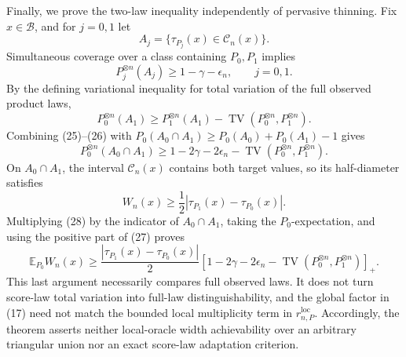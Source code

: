 Finally, we prove the two-law inequality independently of pervasive thinning.  Fix \(x\in\mathcal B\), and for \(j=0,1\) let
\[
 A_j=\{\tau_{P_j}(x)\in\mathcal C_n(x)\}.
\]
Simultaneous coverage over a class containing \(P_0,P_1\) implies
\[
 P_j^{\otimes n}(A_j)\ge1-\gamma-\epsilon_n,\qquad j=0,1. \tag{25}
\]
By the defining variational inequality for total variation of the full observed product laws,
\[
 P_0^{\otimes n}(A_1)\ge P_1^{\otimes n}(A_1)
 -\operatorname{TV}(P_0^{\otimes n},P_1^{\otimes n}). \tag{26}
\]
Combining (25)--(26) with \(P_0(A_0\cap A_1)\ge P_0(A_0)+P_0(A_1)-1\) gives
\[
 P_0^{\otimes n}(A_0\cap A_1)\ge
 1-2\gamma-2\epsilon_n-\operatorname{TV}(P_0^{\otimes n},P_1^{\otimes n}). \tag{27}
\]
On \(A_0\cap A_1\), the interval \(\mathcal C_n(x)\) contains both target values, so its half-diameter satisfies
\[
 W_n(x)\ge\frac12|\tau_{P_1}(x)-\tau_{P_0}(x)|. \tag{28}
\]
Multiplying (28) by the indicator of \(A_0\cap A_1\), taking the \(P_0\)-expectation, and using the positive part of (27) proves
\[
 \mathbb E_{P_0}W_n(x)\ge
 \frac{|\tau_{P_1}(x)-\tau_{P_0}(x)|}{2}
 \left[1-2\gamma-2\epsilon_n-\operatorname{TV}(P_0^{\otimes n},P_1^{\otimes n})\right]_+.
\]
This last argument necessarily compares full observed laws.  It does not turn score-law total variation into full-law distinguishability, and the global factor in (17) need not match the bounded local multiplicity term in \(r_{n,P}^{\mathrm{loc}}\).  Accordingly, the theorem asserts neither local-oracle width achievability over an arbitrary triangular union nor an exact score-law adaptation criterion.